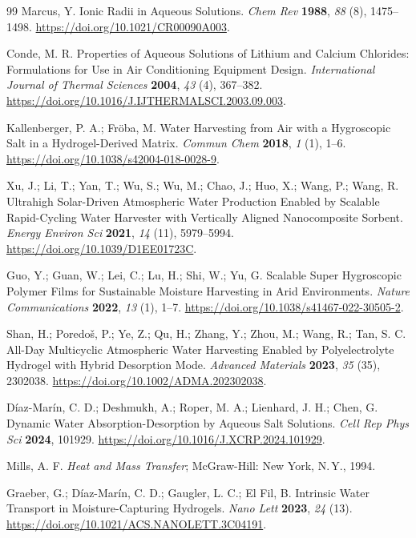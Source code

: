 \documentclass[11pt]{article}
\begin{document}
\begin{thebibliography}{99}
 Marcus, Y. Ionic Radii in Aqueous Solutions. \textit{Chem Rev} \textbf{1988}, \textit{88} (8), 1475--1498. \url{https://doi.org/10.1021/CR00090A003}.

 Conde, M. R. Properties of Aqueous Solutions of Lithium and Calcium Chlorides: Formulations for Use in Air Conditioning Equipment Design. \textit{International Journal of Thermal Sciences} \textbf{2004}, \textit{43} (4), 367--382. \url{https://doi.org/10.1016/J.IJTHERMALSCI.2003.09.003}.

 Kallenberger, P. A.; Fr\"oba, M. Water Harvesting from Air with a Hygroscopic Salt in a Hydrogel-Derived Matrix. \textit{Commun Chem} \textbf{2018}, \textit{1} (1), 1--6. \url{https://doi.org/10.1038/s42004-018-0028-9}.

 Xu, J.; Li, T.; Yan, T.; Wu, S.; Wu, M.; Chao, J.; Huo, X.; Wang, P.; Wang, R. Ultrahigh Solar-Driven Atmospheric Water Production Enabled by Scalable Rapid-Cycling Water Harvester with Vertically Aligned Nanocomposite Sorbent. \textit{Energy Environ Sci} \textbf{2021}, \textit{14} (11), 5979--5994. \url{https://doi.org/10.1039/D1EE01723C}.

 Guo, Y.; Guan, W.; Lei, C.; Lu, H.; Shi, W.; Yu, G. Scalable Super Hygroscopic Polymer Films for Sustainable Moisture Harvesting in Arid Environments. \textit{Nature Communications} \textbf{2022}, \textit{13} (1), 1--7. \url{https://doi.org/10.1038/s41467-022-30505-2}.

 Shan, H.; Poredo\v{s}, P.; Ye, Z.; Qu, H.; Zhang, Y.; Zhou, M.; Wang, R.; Tan, S. C. All-Day Multicyclic Atmospheric Water Harvesting Enabled by Polyelectrolyte Hydrogel with Hybrid Desorption Mode. \textit{Advanced Materials} \textbf{2023}, \textit{35} (35), 2302038. \url{https://doi.org/10.1002/ADMA.202302038}.

 D\'iaz-Mar\'in, C. D.; Deshmukh, A.; Roper, M. A.; Lienhard, J. H.; Chen, G. Dynamic Water Absorption-Desorption by Aqueous Salt Solutions. \textit{Cell Rep Phys Sci} \textbf{2024}, 101929. \url{https://doi.org/10.1016/J.XCRP.2024.101929}.

 Mills, A. F. \textit{Heat and Mass Transfer}; McGraw-Hill: New York, N.\,Y., 1994.

 Graeber, G.; D\'iaz-Mar\'in, C. D.; Gaugler, L. C.; El Fil, B. Intrinsic Water Transport in Moisture-Capturing Hydrogels. \textit{Nano Lett} \textbf{2023}, \textit{24} (13). \url{https://doi.org/10.1021/ACS.NANOLETT.3C04191}.


\end{thebibliography}
\end{document}
